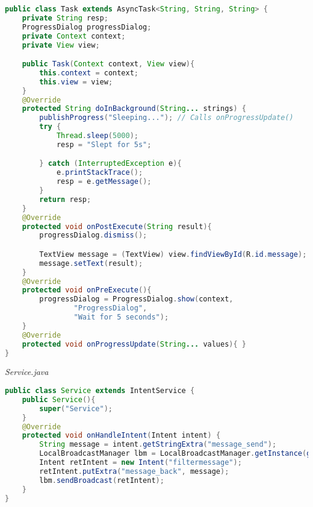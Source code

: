 \begin{lstlisting}[language=java]
public class Task extends AsyncTask<String, String, String> {
    private String resp;
    ProgressDialog progressDialog;
    private Context context;
    private View view;

    public Task(Context context, View view){
        this.context = context;
        this.view = view;
    }
    @Override
    protected String doInBackground(String... strings) {
        publishProgress("Sleeping..."); // Calls onProgressUpdate()
        try {
            Thread.sleep(5000);
            resp = "Slept for 5s";

        } catch (InterruptedException e){
            e.printStackTrace();
            resp = e.getMessage();
        }
        return resp;
    }
    @Override
    protected void onPostExecute(String result){
        progressDialog.dismiss();

        TextView message = (TextView) view.findViewById(R.id.message);
        message.setText(result);
    }
    @Override
    protected void onPreExecute(){
        progressDialog = ProgressDialog.show(context,
                "ProgressDialog",
                "Wait for 5 seconds");
    }
    @Override
    protected void onProgressUpdate(String... values){ }
}
\end{lstlisting}
\textit{Service.java}
\begin{lstlisting}[language=java]
public class Service extends IntentService {
    public Service(){
        super("Service");
    }
    @Override
    protected void onHandleIntent(Intent intent) {
        String message = intent.getStringExtra("message_send");
        LocalBroadcastManager lbm = LocalBroadcastManager.getInstance(getApplicationContext());
        Intent retIntent = new Intent("filtermessage");
        retIntent.putExtra("message_back", message);
        lbm.sendBroadcast(retIntent);
    }
}
\end{lstlisting}

